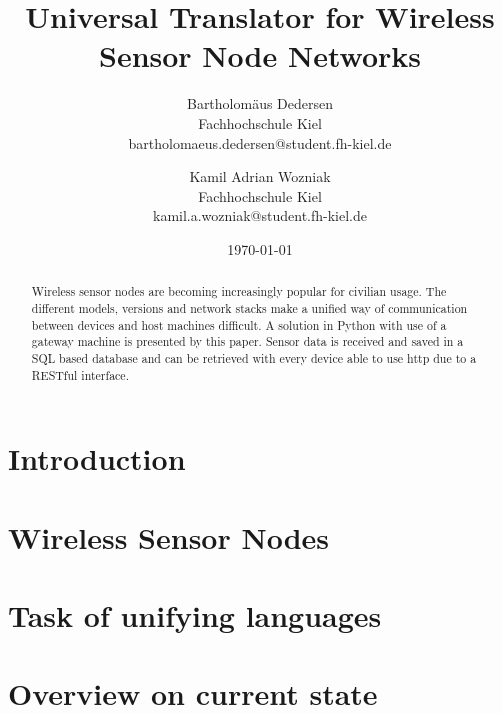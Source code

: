 \documentclass[bibtotocnumbered, headsepline,normalheadings]{report}
\begin{document}
\author{ 
Bartholomäus Dedersen \\ Fachhochschule Kiel \\ bartholomaeus.dedersen@student.fh-kiel.de \and
Kamil Adrian Wozniak  \\ Fachhochschule Kiel \\ kamil.a.wozniak@student.fh-kiel.de }

\date{\today} 
\title{Universal Translator for Wireless Sensor Node Networks} 

\maketitle


\begin{abstract}

    Wireless sensor nodes are becoming increasingly popular for civilian usage. The different models, versions and network stacks make a 
    unified way of communication between devices and host machines difficult. A solution in Python with use of a gateway machine is presented 
    by this paper. Sensor data is received and saved in a SQL based database and can be retrieved with every device able to use http due to a 
    RESTful interface.

\end{abstract}

\tableofcontents \newpage

\chapter{Introduction}



\chapter{Wireless Sensor Nodes}



\chapter{Task of unifying languages}
\label{chap:unify}



\chapter{Overview on current state}
\end{document}
